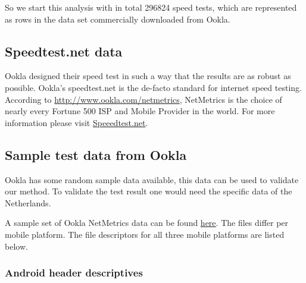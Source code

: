 \documentclass[]{article}
\begin{document}
\newpage
So we start this analysis with in total 296824 speed tests, which are
represented as rows in the data set commercially downloaded from Ookla.

\subsection{Speedtest.net data}\label{speedtest.net-data}

Ookla designed their speed test in such a way that the results are as
robust as possible. Ookla's speedtest.net is the de-facto standard for
internet speed testing. According to
\url{http://www.ookla.com/netmetrics}, NetMetrics is the choice of
nearly every Fortune 500 ISP and Mobile Provider in the world. For more
information please visit
\href{https://support.speedtest.net/hc/en-us}{Speeedtest.net}.

\subsection{Sample test data from
Ookla}\label{sample-test-data-from-ookla}

Ookla has some random sample data available, this data can be used to
validate our method. To validate the test result one would need the
specific data of the Netherlands.

A sample set of Ookla NetMetrics data can be found
\href{http://www.ookla.com/netmetrics}{here}. The files differ per
mobile platform. The file descriptors for all three mobile platforms are
listed below.

\subsubsection{Android header
descriptives}\label{android-header-descriptives}

\footnotesize
\end{document}
